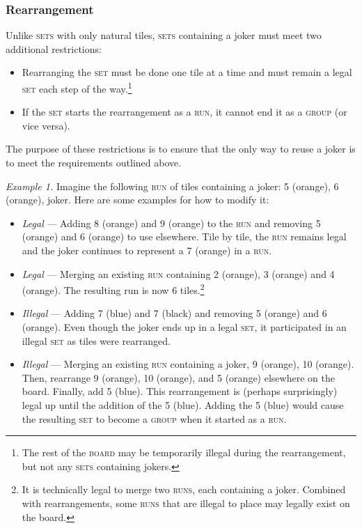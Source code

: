 \documentclass{article}
\begin{document}
\begin{multicols*}{3}
\subsubsection*{Rearrangement}

Unlike \textsc{sets} with only natural tiles, \textsc{sets} containing a joker
must meet two additional restrictions:

\begin{itemize}
	\item Rearranging the \textsc{set} must be done one tile at a time and
		must remain a legal \textsc{set} each step of the
		way.\footnote{The rest of the \textsc{board} may be temporarily
		illegal during the rearrangement, but not any \textsc{sets}
		containing jokers.}
	\item If the \textsc{set} starts the rearrangement as a \textsc{run}, it
		cannot end it as a \textsc{group} (or vice versa).
\end{itemize}

The purpose of these restrictions is to ensure that the only way to reuse a
joker is to meet the requirements outlined above.

\medskip
\noindent\textit{Example 1.} Imagine the following \textsc{run} of tiles
containing a joker: 5 (orange), 6 (orange), joker. Here are some examples for
how to modify it:

\begin{itemize}
	\item \textit{Legal} --- Adding 8 (orange) and 9 (orange) to the
		\textsc{run} and removing 5 (orange) and 6 (orange) to use
		elsewhere. Tile by tile, the \textsc{run} remains legal and the
		joker continues to represent a 7 (orange) in a \textsc{run}.
	\item \textit{Legal} --- Merging an existing \textsc{run} containing 2
		(orange), 3 (orange) and 4 (orange). The resulting run is now 6
		tiles.\footnote{It is technically legal to merge two
		\textsc{runs}, each containing a joker. Combined with
		rearrangements, some \textsc{runs} that are illegal to place may
		legally exist on the board.}
	\item \textit{Illegal} --- Adding 7 (blue) and 7 (black) and removing 5
		(orange) and 6 (orange). Even though the joker ends up in a
		legal \textsc{set}, it participated in an illegal \textsc{set}
		as tiles were rearranged.
	\item \textit{Illegal} --- Merging an existing \textsc{run} containing a
		joker, 9 (orange), 10 (orange). Then, rearrange 9 (orange), 10
		(orange), and 5 (orange) elsewhere on the board. Finally, add 5
		(blue). This rearrangement is (perhaps surprisingly) legal up
		until the addition of the 5 (blue). Adding the 5 (blue) would
		cause the resulting \textsc{set} to become a \textsc{group} when
		it started as a \textsc{run}.
\end{itemize}


\end{multicols*}
\end{document}
